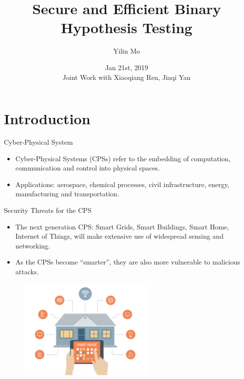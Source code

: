 \documentclass[10pt]{beamer}
\title[Hypothesis Testing]{Secure and Efficient Binary Hypothesis Testing}
\author[Yilin Mo]{Yilin Mo}
\institute[Tsinghua]{
  Department of Automation\\ Tsinghua University\\
}
\date[Jan 21st, 2019]{Jan 21st, 2019 \\ 
  \small Joint Work with Xiaoqiang Ren, Jiaqi Yan}
\begin{document}
\maketitle 

\section{Introduction}

\begin{frame}{Cyber-Physical System}
  \begin{itemize}
  \item Cyber-Physical Systems (CPSs) refer to the embedding of computation, communication and control into physical spaces.
    \begin{center}
    \end{center}
  \item Applications: aerospace, chemical processes, civil infrastructure, energy, manufacturing and transportation. 
  \end{itemize}
\end{frame}

\begin{frame}{Security Threats for the CPS}
  \begin{itemize}
  \item The next generation CPS: Smart Grids, Smart Buildings, Smart Home, Internet of Things, will make extensive use of widespread sensing and networking.
  \item As the CPSs become ``smarter'', they are also more vulnerable to malicious attacks.
  \end{itemize}
  \begin{figure}[ht]
    \centering
    \includegraphics[width=0.6\textwidth]{SmartHome.jpg}
  \end{figure}
\end{frame}
\end{document}
